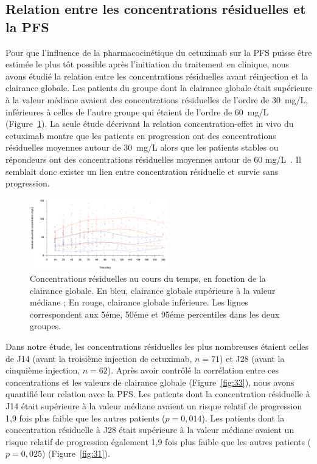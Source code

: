 \subsection{Relation entre les concentrations résiduelles et la PFS}
Pour que l'influence de la pharmacocinétique du cetuximab sur la PFS puisse être estimée le plus tôt possible après l'initiation du traitement en clinique, nous avons étudié la relation entre les concentrations résiduelles avant réinjection et la clairance globale. Les patients du groupe dont la clairance globale était supérieure à la valeur médiane avaient des concentrations résiduelles de l'ordre de 30~mg/L, inférieures à celles de l'autre groupe qui étaient de l'ordre de 60~mg/L (Figure~\ref{fig:29}). La seule étude décrivant la relation concentration-effet in vivo du cetuximab montre que les patients en progression ont des concentrations résiduelles moyennes autour de 30~mg/L alors que les patients stables ou répondeurs ont des concentrations résiduelles moyennes autour de 60 mg/L~\citep{REF122}. Il semblait donc exister un lien entre concentration résiduelle et survie sans progression. 
\begin{figure}[htbp]
	\centering
		\includegraphics[width=6cm]{figures/raster/FIG_29}
	\caption{Concentrations résiduelles au cours du temps, en fonction de la clairance globale. En bleu, clairance globale supérieure à la valeur médiane ; En rouge, clairance globale inférieure. Les lignes correspondent aux 5éme, 50éme et 95éme percentiles dans les deux groupes.}
	\label{fig:29}
\end{figure}
Dans notre étude, les concentrations résiduelles les plus nombreuses étaient celles de J14 (avant la troisième injection de cetuximab, $n = 71$) et J28 (avant la cinquième injection, $n = 62$). Après avoir contrôlé la corrélation entre ces concentrations et les valeurs de clairance globale (Figure~\ref{fig:33}), nous avons quantifié leur relation  avec la PFS. Les patients dont la concentration résiduelle à J14 était supérieure à la valeur médiane avaient un risque relatif de progression 1,9 fois plus faible que les autres patients ($p = 0,014$). Les patients dont la concentration résiduelle à J28 était supérieure à la valeur médiane avaient un risque relatif de progression également 1,9 fois plus faible que les autres patients ($p = 0,025$) (Figure~\ref{fig:31}).
